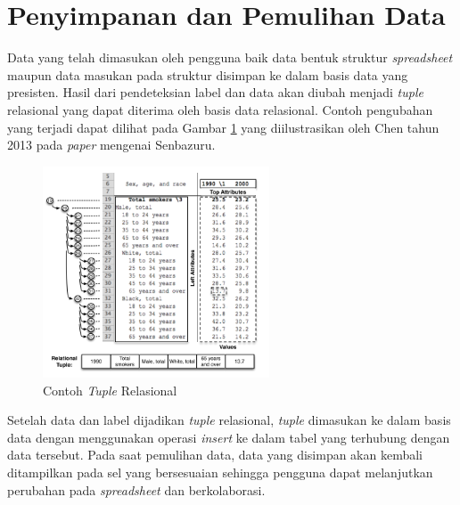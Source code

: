 \section{Penyimpanan dan Pemulihan Data}
Data yang telah dimasukan oleh pengguna baik data bentuk struktur \textit{spreadsheet} maupun data masukan pada struktur disimpan ke dalam basis data yang presisten. Hasil dari pendeteksian label dan data akan diubah menjadi \textit{tuple} relasional yang dapat diterima oleh basis data relasional. Contoh pengubahan yang terjadi dapat dilihat pada Gambar \ref{RelationalTuple} yang diilustrasikan oleh Chen tahun 2013 pada \textit{paper} mengenai Senbazuru.

\begin{figure}[htb]
    \centering
    \includegraphics[width=0.6\textwidth]{resources/chapter-3-relational-tuple.png}
    \caption{Contoh \textit{Tuple} Relasional \parencite{Chen2013}}
	\label{RelationalTuple}
\end{figure}

Setelah data dan label dijadikan \textit{tuple} relasional, \textit{tuple} dimasukan ke dalam basis data dengan menggunakan operasi \textit{insert} ke dalam tabel yang terhubung dengan data tersebut. Pada saat pemulihan data, data yang disimpan akan kembali ditampilkan pada sel yang bersesuaian sehingga pengguna dapat melanjutkan perubahan pada \textit{spreadsheet} dan berkolaborasi.
